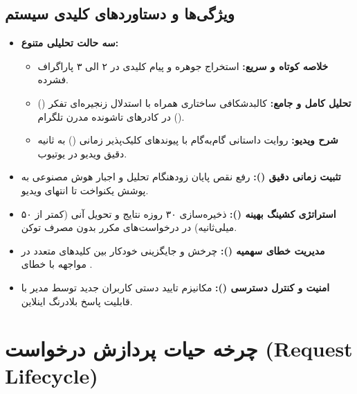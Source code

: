 \documentclass[11pt,a4paper]{report}
\begin{document}
\section{ویژگی‌ها و دستاوردهای کلیدی سیستم}
\begin{itemize}
    \item \textbf{سه حالت تحلیلی متنوع:}
    \begin{itemize}
        \item \textbf{خلاصه کوتاه و سریع:} استخراج جوهره و پیام کلیدی در ۲ الی ۳ پاراگراف فشرده.
        \item \textbf{تحلیل کامل و جامع:} کالبدشکافی ساختاری همراه با استدلال زنجیره‌ای تفکر () در کادرهای تاشونده مدرن تلگرام ().
        \item \textbf{شرح ویدیو:} روایت داستانی گام‌به‌گام با پیوندهای کلیک‌پذیر زمانی () به ثانیه دقیق ویدیو در یوتیوب.
    \end{itemize}
    \item \textbf{تثبیت زمانی دقیق ():} رفع نقص پایان زودهنگام تحلیل و اجبار هوش مصنوعی به پوشش یکنواخت تا انتهای ویدیو.
    \item \textbf{استراتژی کشینگ بهینه ():} ذخیره‌سازی ۳۰ روزه نتایج و تحویل آنی (کمتر از ۵۰ میلی‌ثانیه) در درخواست‌های مکرر بدون مصرف توکن.
    \item \textbf{مدیریت خطای سهمیه ():} چرخش و جایگزینی خودکار بین کلیدهای متعدد در مواجهه با خطای .
    \item \textbf{امنیت و کنترل دسترسی ():} مکانیزم تایید دستی کاربران جدید توسط مدیر با قابلیت پاسخ بلادرنگ اینلاین.
\end{itemize}

\chapter{چرخه حیات پردازش درخواست (Request Lifecycle)}
\end{document}
